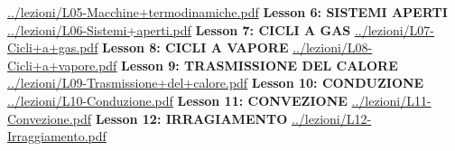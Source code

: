 \url{../lezioni/L05-Macchine+termodinamiche.pdf}
\newline
\newline
\textbf{Lesson 6: SISTEMI APERTI}\newline
\url{../lezioni/L06-Sistemi+aperti.pdf}
\newline
\newline
\textbf{Lesson 7: CICLI A GAS}\newline
\url{../lezioni/L07-Cicli+a+gas.pdf}
\newline
\newline
\textbf{Lesson 8: CICLI A VAPORE}\newline
\url{../lezioni/L08-Cicli+a+vapore.pdf}
\newline
\newline
\textbf{Lesson 9: TRASMISSIONE DEL CALORE}\newline
\url{../lezioni/L09-Trasmissione+del+calore.pdf}
\newline
\newline
\textbf{Lesson 10: CONDUZIONE}\newline
\url{../lezioni/L10-Conduzione.pdf}
\newline
\newline
\textbf{Lesson 11: CONVEZIONE}\newline
\url{../lezioni/L11-Convezione.pdf}
\newline
\newline
\textbf{Lesson 12: IRRAGIAMENTO}\newline
\url{../lezioni/L12-Irraggiamento.pdf}